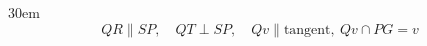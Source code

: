 \documentclass[border=4pt]{standalone}
\begin{document}
\begin{varwidth}{30em}
\large
\[ QR \parallel SP,\quad QT \perp SP,\quad Qv \parallel \text{tangent},\ Qv \cap PG = v \]

\end{varwidth}
\end{document}
